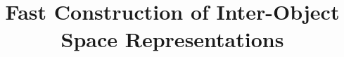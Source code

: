 \documentclass[final,3p,times,twocolumn]{elsarticle}
\begin{document}
\begin{frontmatter}



\title{Fast Construction of Inter-Object Space Representations}





\end{frontmatter}
\end{document}
